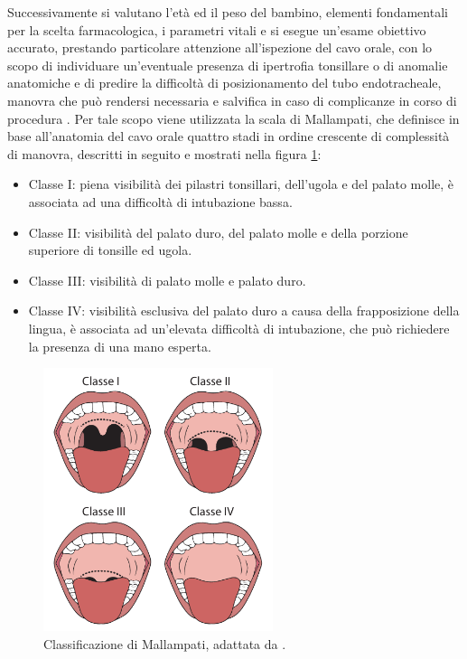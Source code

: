 Successivamente si valutano l'età ed il peso del bambino, elementi fondamentali per la scelta farmacologica, i parametri vitali e si esegue un'esame obiettivo accurato, prestando particolare attenzione all'ispezione del cavo orale, con lo scopo di individuare un'eventuale presenza di ipertrofia tonsillare o di anomalie anatomiche e di predire la difficoltà di posizionamento del tubo endotracheale, manovra che può rendersi necessaria e salvifica in caso di complicanze in corso di procedura \cite{Guidelines2019}. Per tale scopo viene utilizzata la scala di Mallampati, che definisce in base all'anatomia del cavo orale quattro stadi in ordine crescente di complessità di manovra, descritti in seguito e mostrati nella figura \ref{fig:mallampati}:

\begin{itemize}
    \item Classe I: piena visibilità dei pilastri tonsillari, dell'ugola e del palato molle, è associata ad una difficoltà di intubazione bassa.
    \item Classe II: visibilità del palato duro, del palato molle e della porzione superiore di tonsille ed ugola.
    \item Classe III: visibilità di palato molle e palato duro.
    \item Classe IV: visibilità esclusiva del palato duro a causa della frapposizione della lingua, è associata ad un'elevata difficoltà di intubazione, che può richiedere la presenza di una mano esperta. 
\end{itemize}

\begin{figure}[h]
    \centering
    \includegraphics[width=0.6\textwidth]{Figure/mallampatpdf.pdf}
    \caption{Classificazione di Mallampati, adattata da \cite{Vargo2012}.}
    \label{fig:mallampati}
\end{figure}

